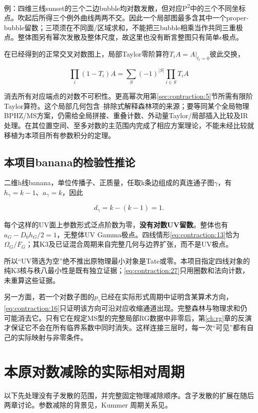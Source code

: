 \documentclass[11pt,a4paper,oneside]{ctexrep}
\theoremstyle{cnplain}
\theoremstyle{definition}
\theoremstyle{remark}
\begin{document}
例：四维三线sunset的三个二边bubble均对数发散，但对应P\textsuperscript{2}中的三个不同坐标点。吹起后所得三个例外曲线两两不交。因此一个局部图最多含其中一个proper-bubble留数；三项须在不同面/区域求和，不能把三bubble相乘当作共同三重极点。整体图另有幂次发散及整体尺度，故这里也没有断言整图只有简单\(\epsilon \)极点。

在已经得到的正常交叉对数图上，局部Taylor零阶算符\(T_i A=A|_{t_i=0}\)彼此交换，

\begin{equation}
\prod_i(1-T_i)A=\sum_{S}(-1)^{|S|}\prod_{i\in S}T_i A          \label{eq:contraction:26}
\end{equation}

消去所有对应端点的对数不可积性。更高幂次用第\ref{sec:contraction:5}节所需有限阶Taylor算符。这个局部几何包含--排除式解释森林项的来源；要等同某个全局物理BPHZ/MS方案，仍需给全局拼接、重叠计数、外动量Taylor/局部插入比较及IR处理。\cite{bbr}在其位置空间、至多对数的主范围内完成了相应方案理论，不能未经比较就移植为本项目所有参数积分的定理。

\section{本项目banana的检验性推论}\label{sec:contraction:8}

二维h线banana，单位传播子、正质量，任取k条边组成的真连通子图\(\gamma \)，有\(h_\gamma =k- 1\)、\(a_\gamma =k\)，因此

\begin{equation}
d_\gamma=k-(k-1)=1.                \label{eq:contraction:27}
\end{equation}

每个这样的UV面上参数形式泛点阶数为零，\textbf{没有对数UV留数}。整体也有\(a_G- D_0h_G/2=1\)，无整体UV Gamma极点。四线情形\eqref{eq:contraction:13}恰为\(\Omega _G/F_G\)；其K3及已证混合周期来自完整几何与边界扩张，而不是UV极点。

所以``UV筛选为空''绝不推出原物理最小对象是Tate或零。本项目指定四线对象的纯K3核与秩八最小性是既有独立证据；\eqref{eq:contraction:27}只用圈数和法向计数，未重算这些证据。

另一方面，若一个对数子图的\(p_\gamma \)已经在实际形式周期中证明含某算术方向，\eqref{eq:contraction:16}只证明该方向可沿对应收缩通道出现。完整森林与物理求和仍可能消去它。只有它在规定MS型的完整局部RG数据中非零后，第\ref{ch:rg}章的反演才保证它不会在所有临界系数中同时消失。这样连接三层时，每一次``可见''都有自己的实际映射与非零条件。


\chapter{本原对数减除的实际相对周期}\label{ch:primitive}
以下先处理没有子发散的范围，并完整固定物理减除顺序。含子发散的扩展在随后两章讨论。参数减除的背景见\cite{bk2008}，Kummer 周期关系见\cite{brownperiods}。
\end{document}
